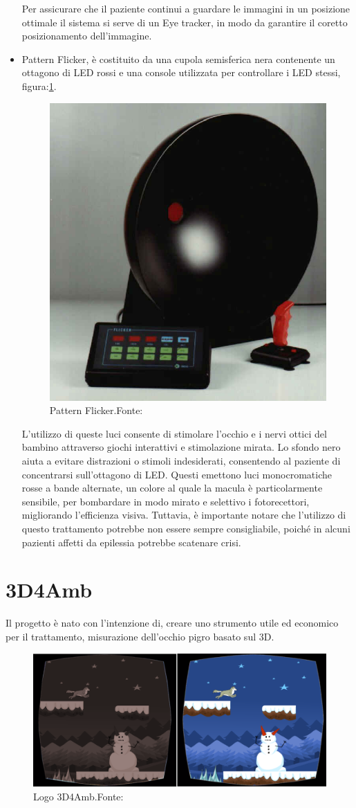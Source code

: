 \documentclass[
a4paper,
cleardoublepage=empty,
headings=twolinechapter,
numbers=autoenddot,
]{scrbook}
\begin{document}
\begin{itemize}
	    Per assicurare che il paziente continui a guardare le immagini in un posizione ottimale il sistema si serve di un Eye tracker, in modo da garantire il coretto posizionamento dell'immagine.
	    	\item Pattern Flicker\cite{Pattern-Flicker}, è costituito da una cupola semisferica nera contenente un ottagono di LED rossi e una console utilizzata per controllare i LED stessi, figura:\ref{fig:Pattern-Flicker}.
	    \begin{figure}[H]
	    	\centering
	    	\includegraphics[width=0.4\linewidth]{image/Pattern_Flicker}
	    	\caption{Pattern Flicker.Fonte:\cite{Pattern-Flicker}}
	    	\label{fig:Pattern-Flicker}
	    \end{figure}
    L'utilizzo di queste luci consente di stimolare l'occhio e i nervi ottici del bambino attraverso giochi interattivi e stimolazione mirata. Lo sfondo nero aiuta a evitare distrazioni o stimoli indesiderati, consentendo al paziente di concentrarsi sull'ottagono di LED. Questi emettono luci monocromatiche rosse a bande alternate, un colore al quale la macula è particolarmente sensibile, per bombardare in modo mirato e selettivo i fotorecettori, migliorando l'efficienza visiva. Tuttavia, è importante notare che l'utilizzo di questo trattamento potrebbe non essere sempre consigliabile, poiché in alcuni pazienti affetti da epilessia potrebbe scatenare crisi.
    \end{itemize}

	\chapter{3D4Amb}
	Il progetto è nato con l'intenzione di, creare uno strumento utile ed economico per il trattamento, misurazione dell'occhio pigro basato sul 3D.
	 \begin{figure}[h]
		\centering
		\includegraphics[width=0.8\linewidth]{image/3D4Amb}
		\caption{Logo 3D4Amb.Fonte:\cite{3d4amb}}
		\label{fig:3D4Amb}
	\end{figure}
\end{document}

